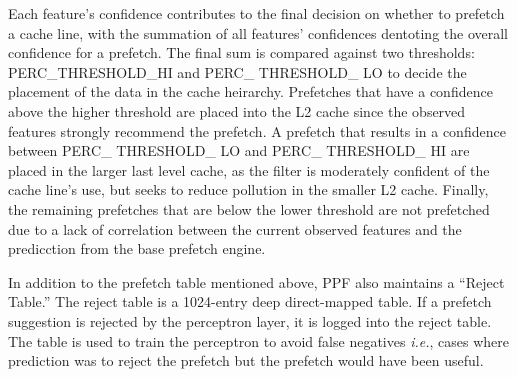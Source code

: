 Each feature's confidence contributes to the final decision on 
whether to prefetch a cache line, with the summation of all features' 
confidences dentoting the overall confidence for a prefetch. 
The final sum is compared against two thresholds: 
 PERC\_THRESHOLD\_HI and  PERC\_ THRESHOLD\_ LO to decide the
 placement of the data in the cache heirarchy. Prefetches that 
have a confidence above the higher threshold are placed into 
the L2 cache since the observed features strongly recommend  
the prefetch. A prefetch that results in a confidence between 
PERC\_ THRESHOLD\_ LO and PERC\_ THRESHOLD\_ HI are placed in 
the larger last level cache, as the filter is moderately confident of 
the cache line's use, but seeks to reduce pollution in the smaller 
L2 cache. Finally, the remaining prefetches that are below the 
lower threshold are not prefetched due to a lack of correlation 
between the current observed features and the predicction from 
the base prefetch engine.

%
%
%


In addition to the prefetch table mentioned above, PPF also maintains
a ``Reject Table.''  The reject table is a 1024-entry deep
direct-mapped table.  If a prefetch suggestion is rejected by the
perceptron layer, it is logged into the reject table.  The table is
used to train the perceptron to 
avoid false negatives \textit{i.e.}, cases where prediction was to
reject the prefetch but the prefetch would have been useful.

